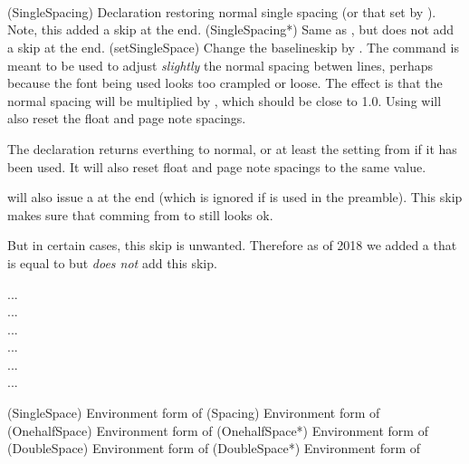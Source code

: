\begin{syntax}
  \cmd{\SingleSpacing}\\
  \cmd{\SingleSpacing*}\\
  \cmd{\setSingleSpace} \\
\end{syntax}
\glossary(SingleSpacing)%
  {}%
  {Declaration restoring normal single spacing (or that set by
    ). Note, this added a skip at the end.}
\glossary(SingleSpacing*)%
  {}%
  {Same as , but does not add a skip at the end.}
\glossary(setSingleSpace)%
  {}%
  {Change the baselineskip by .}
The \cmd{\setSingleSpace} command is meant to be used to
adjust \emph{slightly} the normal spacing betwen lines, perhaps because
the font being used looks too crampled or loose. The effect is that the 
normal \lnc{\baselineskip} spacing will be multiplied by , which
should be close to 1.0. Using \cmd{\setSingleSpace} will also reset
the float and page note spacings.

The declaration \cmd{\SingleSpacing} returns everthing to normal, or at
least the setting from \cmd{\setSingleSpace} if it has been used. It
will also reset float and page note spacings to the same value.

\begin{note}
  \sloppy
  \cmd{\SingleSpacing} will also issue a
  \cmd{\vskip}\cmd{\baselineskip} at the end (which is ignored if
  \cmd{\SingleSpacing} is used in the preamble). This skip makes sure
  that comming from \cmd{\DoubleSpacing} to \cmd{\SingleSpacing} still
  looks ok.

  But in certain cases, this skip is unwanted. Therefore as of 2018 we
  added a \cmd{\SingleSpacing*} that is equal to \cmd{\SingleSpacing}
  but \emph{does not} add this skip.
\end{note}


\begin{syntax}
 ... \\
 ...  \\
 ...  \\
 ...  \\
 ...  \\
 ...  \\
\end{syntax}
\glossary(SingleSpace)%
  {}%
  {Environment form of }
\glossary(Spacing)%
  {}%
  {Environment form of }
\glossary(OnehalfSpace)%
  {}%
  {Environment form of }
\glossary(OnehalfSpace*)%
  {}%
  {Environment form of }
\glossary(DoubleSpace)%
  {}%
  {Environment form of }
\glossary(DoubleSpace*)%
  {}%
  {Environment form of }

